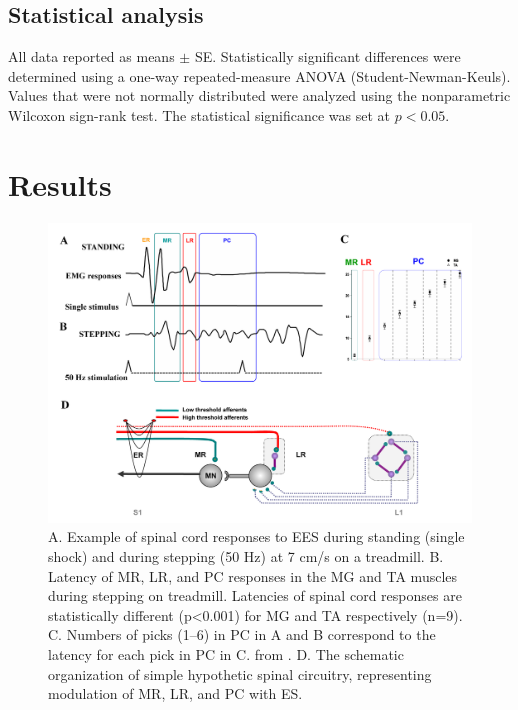 \documentclass[]{elsarticle}
\begin{document}
\subsection{Statistical analysis}

All data reported as means $\pm$ SE. Statistically significant differences were determined using a one-way repeated-measure ANOVA (Student-Newman-Keuls). Values that were not normally distributed were analyzed using the nonparametric Wilcoxon sign-rank test. The statistical significance was set at $p < 0.05$.

\section{Results}

\begin{figure}[ht!]
	\centering
	\includegraphics[width=1.0\textwidth]{fig1.png}
	\caption{
    A. Example of spinal cord responses to EES during standing (single shock) and during stepping (50 Hz) at 7 cm/s on a treadmill. 
    B. Latency of MR, LR, and PC responses in the MG and TA muscles during stepping on treadmill. Latencies of spinal cord responses are statistically different (p<0.001) for MG and TA respectively (n=9). 
    C. Numbers of picks (1--6) in PC in A and B correspond to the latency for each pick in PC in C. from \cite{lavrov2008}. 
    D. The schematic organization of simple hypothetic spinal circuitry, representing modulation of MR, LR, and PC with ES.}
    \label{fig:fig1}
\end{figure}
\end{document}
